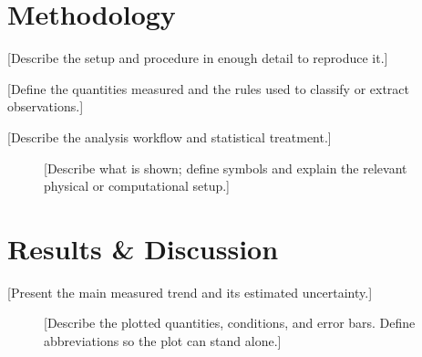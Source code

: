 \documentclass[
 reprint,
 amsmath,amssymb,
 aps,
]{revtex4-2}
\begin{document}
\section{Methodology}
\label{sec:methodology}

[Describe the setup and procedure in enough detail to reproduce it.]

[Define the quantities measured and the rules used to classify or
extract observations.]

[Describe the analysis workflow and statistical treatment.]

\begin{figure}[htbp]
    \centering
    \caption{[Describe what is shown; define symbols and explain
    the relevant physical or computational setup.]}
    \label{fig:setup}
\end{figure}

\section{Results \& Discussion}
\label{sec:results}

[Present the main measured trend and its estimated uncertainty.]

\begin{figure}[htbp]
    \centering
    \caption{[Describe the plotted quantities, conditions, and error
    bars. Define abbreviations so the plot can stand alone.]}
    \label{fig:main_result}
\end{figure}
\end{document}
